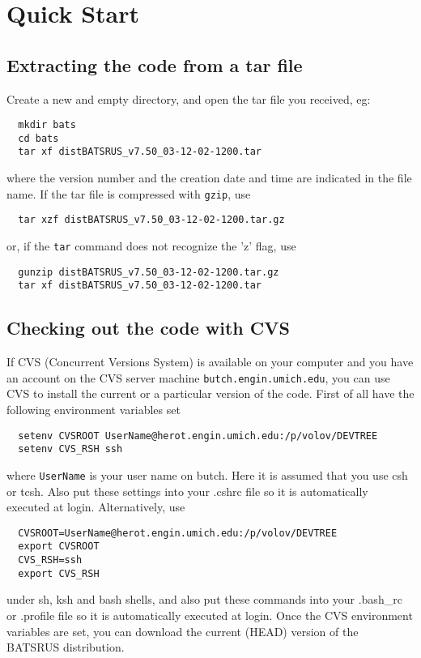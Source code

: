 \section{Quick Start \label{section:quick_start}}

\subsection{Extracting the code from a tar file}

Create a new and empty directory, and open the tar file you received, eg:
\begin{verbatim}
  mkdir bats
  cd bats
  tar xf distBATSRUS_v7.50_03-12-02-1200.tar  
\end{verbatim}
where the version number and the creation date and time are indicated
in the file name. If the tar file is compressed with {\tt gzip}, use
\begin{verbatim}
  tar xzf distBATSRUS_v7.50_03-12-02-1200.tar.gz
\end{verbatim}
or, if the {\tt tar} command does not recognize the 'z' flag, use
\begin{verbatim}
  gunzip distBATSRUS_v7.50_03-12-02-1200.tar.gz
  tar xf distBATSRUS_v7.50_03-12-02-1200.tar
\end{verbatim}

\subsection{Checking out the code with CVS}

If CVS (Concurrent Versions System) is available on your computer
and you have an account on the CVS server machine 
{\tt butch.engin.umich.edu}, you can use CVS to install
the current or a particular version of the code.
First of all have the following environment variables set
\begin{verbatim}
  setenv CVSROOT UserName@herot.engin.umich.edu:/p/volov/DEVTREE
  setenv CVS_RSH ssh
\end{verbatim}
where {\tt UserName} is your user name on butch. Here it is assumed
that you use csh or tcsh. Also put these settings into your .cshrc file
so it is automatically executed at login. Alternatively, use
\begin{verbatim}
  CVSROOT=UserName@herot.engin.umich.edu:/p/volov/DEVTREE
  export CVSROOT
  CVS_RSH=ssh
  export CVS_RSH
\end{verbatim}
under sh, ksh and bash shells, and also put these commands into your 
.bash\_rc or .profile file so it is automatically executed at login.
Once the CVS environment variables are set, you can download the
current (HEAD) version of the BATSRUS distribution.

